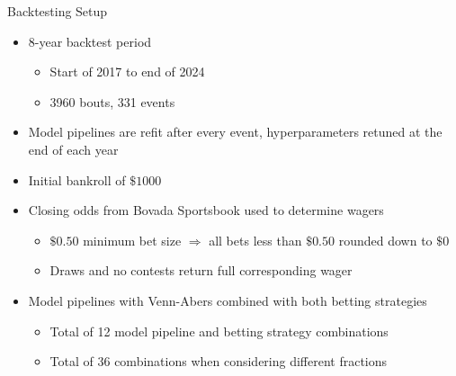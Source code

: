 \documentclass[aspectratio=169,xcolor=dvipsnames]{beamer}
\begin{document}
\begin{frame}{Backtesting Setup}
    \begin{itemize}
        \item 8-year backtest period
        \begin{itemize}
            \item Start of 2017 to end of 2024

            \item 3960 bouts, 331 events
        \end{itemize}

        \item Model pipelines are refit after every event, hyperparameters retuned at the end of each year

        \item Initial bankroll of $\$1000$

        \item Closing odds from Bovada Sportsbook used to determine wagers
        \begin{itemize}
            \item $\$0.50$ minimum bet size $\Longrightarrow$ all bets less than $\$0.50$ rounded down to $\$0$

            \item Draws and no contests return full corresponding wager
        \end{itemize}

        \item Model pipelines with Venn-Abers combined with both betting strategies
        \begin{itemize}
            \item Total of 12 model pipeline and betting strategy combinations

            \item Total of 36 combinations when considering different fractions
        \end{itemize}
    \end{itemize}
\end{frame}

\end{document}
